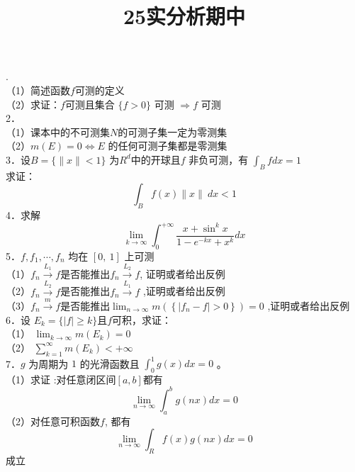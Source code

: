 \documentclass[UTF8]{ctexart}
\title{25实分析期中}
\author{}
\date{}
\begin{document}
\maketitle
{}.\\
（1）简述函数$f$可测的定义\\
（2）求证：$f$可测且集合 $\{f>0\}$ 可测 $\Rightarrow f$ 可测\\
2．\\
（1）课本中的不可测集$N$的可测子集一定为零测集\\
（2）$m(E)=0 \Leftrightarrow E$ 的任何可测子集都是零测集 \\
3．设$B=\{\|x\|<1\}$ 为$R^d$中的开球且$f$ 非负可测，有 $\int_{B} f d x=1$\\
求证： 
$$\int_{B} f(x)\|x\| \ d x<1$$ 
4．求解 
$$\lim _{k \rightarrow \infty} \int_{0}^{+\infty} \frac{x+\sin ^{k} x}{1-e^{-k x}+x^{k}} d x$$
5．$f, f_{1}, \cdots, f_n$ 均在 $[0, ~ 1]$ 上可测\\
（1）$f_{n} \stackrel{L_1}{\longrightarrow} f$是否能推出$f_n \stackrel{L_2}{\longrightarrow} f$, 证明或者给出反例\\
（2）$f_{n} \stackrel{L_2}{\longrightarrow} f$是否能推出$f_n \stackrel{L_1}{\longrightarrow} f$ ,证明或者给出反例\\
（3）$f_{n} \stackrel{m}{\longrightarrow} f$是否能推出$\lim _{n \rightarrow \infty} m\left(\left\{\left|f_n-f\right|>0\right\}\right)=0$ ,证明或者给出反例\\
6．设 $E_k=\{|f| \geqslant k\}$且$f$可积，求证：\\
（1） $\lim _{k \rightarrow \infty} m(E_k)=0$\\
（2） $\sum_{k=1}^{\infty} m(E_k)<+\infty$\\
7．$g$ 为周期为 $1$ 的光滑函数且 $\int_{0}^{1} g(x) d x=0$ 。\\
（1）求证 :对任意闭区间$[a, b]$都有 
$$\lim _{n \rightarrow \infty} \int_{a}^{b} g(n x) d x=0 $$
（2）对任意可积函数$f$, 都有
$$\lim _{n \rightarrow \infty} \int_{R}f(x) g(n x) d x=0$$
 成立
\end{document}

